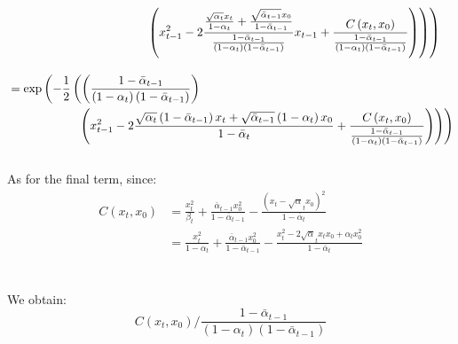 \documentclass{article}
\begin{document}
\begin{align}
  &\hspace{4cm} \left. \left. \left(x_{t-1}^2 - 2 \frac{\frac{\sqrt{\alpha_t}x_t}{1 - \alpha_t} + \frac{\sqrt{\bar{\alpha}_{t-1}} x_0}{1 - \bar{\alpha}_{t-1}}}{\frac{1 - \bar{\alpha}_{t-1}}{\left(1 - \alpha_t\right)\left(1 - \bar{\alpha}_{t-1}\right)}} x_{t-1} + \frac{C\left(x_t, x_0\right)}{\frac{1 - \bar{\alpha}_{t-1}}{\left(1 - \alpha_t\right)\left(1 - \bar{\alpha}_{t-1}\right)}}\right) \right) \right) \notag \\[10pt]
  &= \exp \left(- \frac{1}{2} \left( \left(\frac{1 - \bar{\alpha}_{t-1}}{\left(1 - \alpha_t\right)\left(1 - \bar{\alpha}_{t-1}\right)}\right)  \right. \right. \\
  &\hspace{2cm} \left. \left. \left(x_{t-1}^2 - 2 \frac{\sqrt{\alpha_t} \left(1 - \bar{\alpha}_{t-1}\right) x_t + \sqrt{\bar{\alpha}_{t-1}}\left(1 - \alpha_t\right) x_0}{1 - \bar{\alpha}_t} + \frac{C\left(x_t, x_0\right)}{\frac{1 - \bar{\alpha}_{t-1}}{\left(1 - \alpha_t\right)\left(1 - \bar{\alpha}_{t-1}\right)}}\right) \right) \right) \notag 
\end{align}
\\
As for the final term, since:
\begin{align}
  C \left(x_t, x_0\right) &= \frac{x_t^2}{\beta_t} + \frac{\bar{\alpha}_{t-1} x_0^2}{1 - \bar{\alpha}_{t-1}} - \frac{\left(x_t - \sqrt{\alpha}_t x_0\right)^2}{1 - \bar{\alpha}_{t}} \\
  &= \frac{x_t^2}{1 - \alpha_t} + \frac{\bar{\alpha}_{t-1} x_0^2}{1 - \bar{\alpha}_{t-1}} - \frac{x_t^2 - 2 \sqrt{\alpha}_t x_t x_0 + \alpha_t x_0^2}{1 - \bar{\alpha}_{t}}
\end{align}
\\\\
We obtain:
\begin{equation}
  C\left(x_t, x_0\right) / \frac{1 - \bar{\alpha}_{t-1}}{\left(1 - \alpha_t\right)\left(1 - \bar{\alpha}_{t-1}\right)} 
\end{equation}
\end{document}
